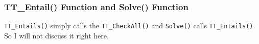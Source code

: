 \documentclass{assignment}
\begin{document}
                                                                                                                                                                                                                                                                                                                                                                                                                                                                                                                                                                                                                                               \subsubsection{TT\_Entail() Function and Solve() Function}
                                                                                                                                                                                                                                                                                                                                                                                                                                                                                                                                                                                                                                                                                                                                                                                                                                                                                                                                                                                                                                                                                                                                                                                                                                                                                          \texttt{TT\_Entails()} simply calls the \texttt{TT\_CheckAll()} and \texttt{Solve()} calls \texttt{TT\_Entails()}. So I will not discuss it right here.
\end{document}
